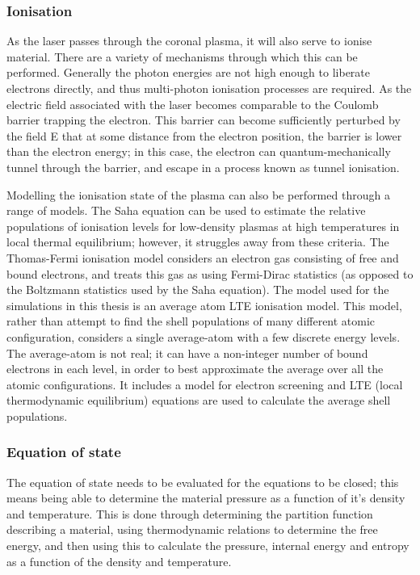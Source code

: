 \subsubsection{Ionisation}
As the laser passes through the coronal plasma, it will also serve to ionise material. There are a variety of mechanisms through which this can be performed. Generally the photon energies are not high enough to liberate electrons directly, and thus multi-photon ionisation processes are required. As the electric field associated with the laser becomes comparable to the Coulomb barrier trapping the electron. This barrier can become sufficiently perturbed by the field E that at some distance from the electron position, the barrier is lower than the electron energy; in this case, the electron can quantum-mechanically tunnel through the barrier, and escape in a process known as tunnel ionisation.

Modelling the ionisation state of the plasma can also be performed through a range of models. The Saha equation can be used to estimate the relative populations of ionisation levels for low-density plasmas at high temperatures in local thermal equilibrium; however, it struggles away from these criteria. The Thomas-Fermi ionisation model considers an electron gas consisting of free and bound electrons, and treats this gas as using Fermi-Dirac statistics (as opposed to the Boltzmann statistics used by the Saha equation). The model used for the simulations in this thesis is an average atom LTE ionisation model. This model, rather than attempt to find the shell populations of many different atomic configuration, considers a single average-atom with a few discrete energy levels. The average-atom is not real; it can have a non-integer number of bound electrons in each level, in order to best approximate the average over all the atomic configurations. It includes a model for electron screening and LTE (local thermodynamic equilibrium) equations are used to calculate the average shell populations. 

\subsubsection{Equation of state}
The equation of state needs to be evaluated for the equations to be closed; this means being able to determine the material pressure as a function of it's density and temperature. This is done through determining the partition function describing a material, using thermodynamic relations to determine the free energy, and then using this to calculate the pressure, internal energy and entropy as a function of the density and temperature.

